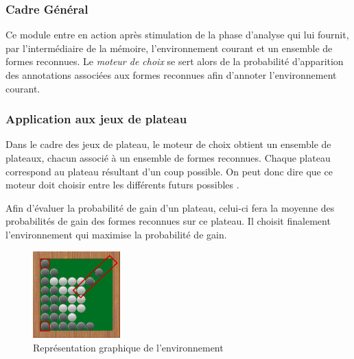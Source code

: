 \subsubsection{Cadre Général}

Ce module entre en action après stimulation de la phase d'analyse qui lui fournit, par l'intermédiaire de la mémoire, l'environnement courant et un ensemble de formes reconnues. Le \emph{moteur de choix} se sert alors de la probabilité d'apparition des annotations associées aux formes reconnues afin d'annoter l'environnement courant.

\subsubsection{Application aux jeux de plateau}

Dans le cadre des jeux de plateau, le moteur de choix obtient un ensemble de plateaux, chacun associé à un ensemble de formes reconnues. Chaque plateau correspond au plateau résultant d'un coup possible. On peut donc dire que ce moteur doit choisir entre les différents \og futurs possibles \fg{}.

Afin d'évaluer la probabilité de gain d'un plateau, celui-ci fera la moyenne des probabilités de gain des formes reconnues sur ce plateau. Il choisit finalement l'environnement qui maximise la probabilité de gain.

\begin{figure}[H] 
  \begin{center}
		\includegraphics[width=0.3\textwidth]{files/raisonneur/moteur_de_choix} 
	\end{center}
\caption{Représentation graphique de l'environnement} 
\label{img_env}
\end{figure}
